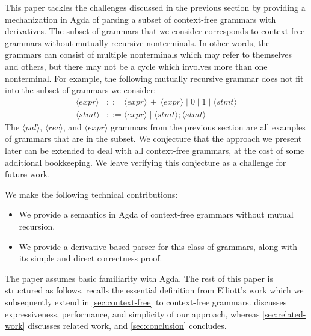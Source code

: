 This paper tackles the challenges discussed in the previous section by providing a mechanization in Agda of parsing a subset of context-free grammars with derivatives.
The subset of grammars that we consider corresponds to context-free grammars without mutually recursive nonterminals.
In other words, the grammars can consist of multiple nonterminals which may refer to themselves and others, but there may not be a cycle which involves more than one nonterminal.
For example, the following mutually recursive grammar does not fit into the subset of grammars we consider:
\begin{align*}
\langle\mathit{expr}\rangle &::= \langle\mathit{expr}\rangle\, +\, \langle\mathit{expr}\rangle \mid 0 \mid 1 \mid \langle\mathit{stmt}\rangle
\\
\langle\mathit{stmt}\rangle &::= \langle\mathit{expr}\rangle \mid \langle\mathit{stmt}\rangle ; \langle\mathit{stmt}\rangle
\end{align*}
The $\langle\mathit{pal}\rangle$, $\langle\mathit{rec}\rangle$, and $\langle\mathit{expr}\rangle$ grammars from the previous section are all examples of grammars that are in the subset.
We conjecture that the approach we present later can be extended to deal with all context-free grammars, at the cost of some additional bookkeeping.
We leave verifying this conjecture as a challenge for future work.

We make the following technical contributions:
\begin{itemize}
\item We provide a semantics in Agda of context-free grammars without mutual recursion.
\item We provide a derivative-based parser for this class of grammars, along with its simple and direct correctness proof.
\end{itemize}

The paper assumes basic familiarity with Agda.
The rest of this paper is structured as follows.
 recalls the essential definition from Elliott's work which we subsequently extend in \cref{sec:context-free} to context-free grammars.
 discusses expressiveness, performance, and simplicity of our approach, whereas
\cref{sec:related-work} discusses related work, and \cref{sec:conclusion} concludes.




\endinput

Parsing is the conversion of flat, human-readable text into a tree structure
that is easier for computers to manipulate.  As one of the central
pillars of compiler tooling since the 1960s, today almost every automated
transformation of computer programs requires a form of parsing.
Though it is a mature research subject, it is still actively studied, for example the question of how to resolve ambiguities in context-free grammars \cite{one-parser-to-rule-them-all}. 

